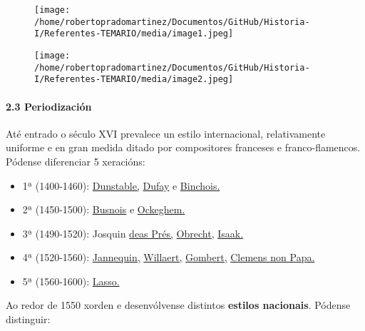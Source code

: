 \documentclass[
]{article}
\begin{document}
\begin{figure}
\centering
\texttt{[image: /home/robertopradomartinez/Documentos/GitHub/Historia-I/Referentes-TEMARIO/media/image1.jpeg]}
\caption{}
\end{figure}

\begin{figure}
\centering
\texttt{[image: /home/robertopradomartinez/Documentos/GitHub/Historia-I/Referentes-TEMARIO/media/image2.jpeg]}
\caption{}
\end{figure}

\hypertarget{23-periodizaciuxf3n}{%
\paragraph{\texorpdfstring{\textbf{2.3
Periodización}}{2.3 Periodización}}\label{23-periodizaciuxf3n}}

Até entrado o século XVI prevalece un estilo internacional,
relativamente uniforme e en gran medida ditado por compositores
franceses e franco-flamencos. Pódense diferenciar 5 xeracións:

\begin{itemize}
\item
  1ª (1400-1460):
  \href{http://es.wikipedia.org/wiki/John_Dunstable}{Dunstable,}
  \href{http://es.wikipedia.org/wiki/Guillaume_Dufay}{Dufay} e
  \href{http://es.wikipedia.org/wiki/Gilles_Binchois}{Binchois.}
\item
  2ª (1450-1500): \href{http://en.wikipedia.org/wiki/Busnois}{Busnois} e
  \href{http://es.wikipedia.org/wiki/Ockeghem}{Ockeghem.}
\item
  3ª (1490-1520): Josquin
  \href{http://es.wikipedia.org/wiki/Josquin_des_Pr\%C3\%A9s}{deas
  Prés,} \href{http://es.wikipedia.org/wiki/Jacob_Obrecht}{Obrecht,}
  \href{http://es.wikipedia.org/wiki/Heinrich_Isaac}{Isaak.}
\item
  4ª (1520-1560):
  \href{http://es.wikipedia.org/wiki/Cl\%C3\%A9ment_Janequin}{Jannequin,}
  \href{http://es.wikipedia.org/wiki/Adrian_Willaert}{Willaert,}
  \href{http://es.wikipedia.org/wiki/Nicolas_Gombert}{Gombert,}
  \href{http://es.wikipedia.org/wiki/Clemens_non_Papa}{Clemens non
  Papa.}
\item
  5ª (1560-1600):
  \href{http://es.wikipedia.org/wiki/Orlando_di_Lasso}{Lasso.}
\end{itemize}

Ao redor de 1550 xorden e desenvólvense distintos \textbf{estilos
nacionais}. Pódense distinguir:
\end{document}
